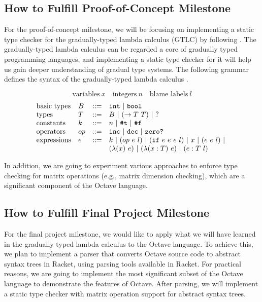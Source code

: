\subsection{How to Fulfill Proof-of-Concept Milestone}
For the proof-of-concept milestone, we will be focusing on implementing a static
type checker for the gradually-typed lambda calculus (GTLC) by following
\cite{siek2012interpretations}. The gradually-typed lambda calculus can be
regarded a core of gradually typed programming languages, and implementing a
static type checker for it will help us gain deeper understanding of gradual
type systems. The following grammar defines the syntax of the gradually-typed
lambda calculus \cite{siek2012interpretations}.

$$ \text{variables} \ x \quad \text{integers} \ n \quad \text{blame labels} \ l $$
$$
\begin{array}{llll}
    \text{basic types} & B & ::= & \text{\tt int} \ | \ \text{\tt bool} \\
    \text{types} & T & ::= & B \ | \ (\rightarrow T \ T) \ | \ \text{?} \\
    \text{constants} & k & ::= & n \ | \ \text{\tt \#t} \ | \ \text{\tt \#f} \\
    \text{operators} & op & ::= & \text{\tt inc} \ | \ \text{\tt dec} \ | \ \text{\tt zero?} \\
    \text{expressions} & e & ::= & k \ | \ (op \ e \ l) \ | \ (\text{\tt if} \ e \ e \ e \ l) \ | \ x \ | \ (e \ e \ l) \ | \ \\
    & & & (\lambda (x) \ e) \ | \ (\lambda (x : T) \ e) \ | \ (e : T \ l)
\end{array}
$$

In addition, we are going to experiment various approaches to enforce type
checking for matrix operations (e.g., matrix dimension checking), which are a
significant component of the Octave language.

\subsection{How to Fulfill Final Project Milestone}
For the final project milestone, we would like to apply what we will have
learned in the gradually-typed lambda calculus to the Octave language. To
achieve this, we plan to implement a parser that converts Octave source code to
abstract syntax trees in Racket, using parsing tools available in Racket.
For practical reasons, we are going to implement the most significant subset of
the Octave language to demonstrate the features of Octave. After parsing, we
will implement a static type checker with matrix operation support for abstract
syntax trees.


